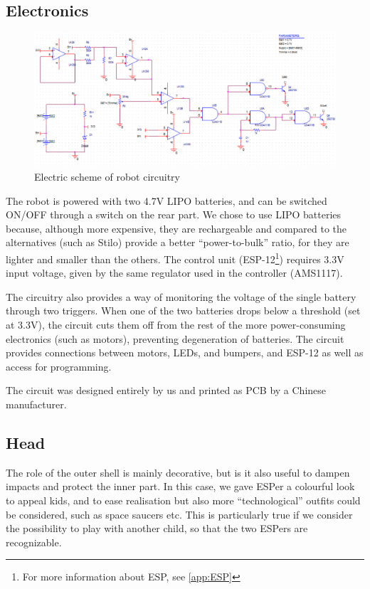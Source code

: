 \documentclass[a4paper,twoside]{book}
\begin{document}
\subsection{Electronics}

\begin{figure}[h]
\includegraphics[width=\textwidth]{img/ProgettoCircuito.eps}
\caption{Electric scheme of robot circuitry}
\label{fig:robot_circ}
\end{figure}

The robot is powered with two 4.7V LIPO batteries, and can be switched ON/OFF through a switch on the rear part. We chose to use LIPO batteries because, although more expensive, they are rechargeable and \textemdash{} compared to the alternatives (such as Stilo) \textemdash{} provide a better \textquotedblleft{}power-to-bulk\textquotedblright{}  ratio, for they are lighter and smaller than the others.
The control unit (ESP-12\footnote{For more information about ESP, see \autoref{app:ESP}}) requires 3.3V input voltage, given by the same regulator used in the controller (AMS1117).

The circuitry also provides a way of monitoring the voltage of the single battery through two triggers. When one of the two batteries drops below a threshold (set at 3.3V), the circuit cuts them off from the rest of the more power-consuming electronics (such as motors), preventing degeneration of batteries. The circuit provides connections between motors, LEDs, and bumpers, and ESP-12 as well as access for programming.

The circuit was designed entirely by us and printed as PCB by a Chinese manufacturer.

\subsection{Head}

The role of the outer shell is mainly decorative, but is it also useful to dampen impacts and protect the inner part. In this case, we gave ESPer a colourful look to appeal kids, and to ease realisation but also more \textquotedblleft{}technological\textquotedblright{} outfits could be considered, such as space saucers etc. This is particularly true if we consider the possibility to play with another child, so that the two ESPers are recognizable.
\end{document}
